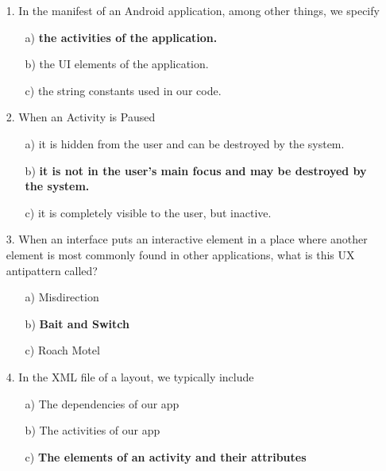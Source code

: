 \documentclass[12pt]{book}
\begin{document}
\begin{itemize}
    \item[1.] In the manifest of an Android application, among other things, we specify
    \begin{itemize}
        \item[a)] \textbf{the activities of the application.}
        \item[b)] the UI elements of the application.
        \item[c)] the string constants used in our code.
    \end{itemize}

    \item[2.] When an Activity is Paused
    \begin{itemize}
        \item[a)] it is hidden from the user and can be destroyed by the system.
        \item[b)] \textbf{it is not in the user's main focus and may be destroyed by the system.}
        \item[c)] it is completely visible to the user, but inactive.
    \end{itemize} 

    \item[3.] When an interface puts an interactive element in a place where another element is most commonly found in other applications, what is this UX antipattern called?
    \begin{itemize}
        \item[a)] Misdirection
        \item[b)] \textbf{Bait and Switch}
        \item[c)] Roach Motel
    \end{itemize} 

    \item[4.] In the XML file of a layout, we typically include
    \begin{itemize}
        \item[a)] The dependencies of our app
        \item[b)] The activities of our app
        \item[c)] \textbf{The elements of an activity and their attributes}
    \end{itemize} 


\end{itemize}
\end{document}

